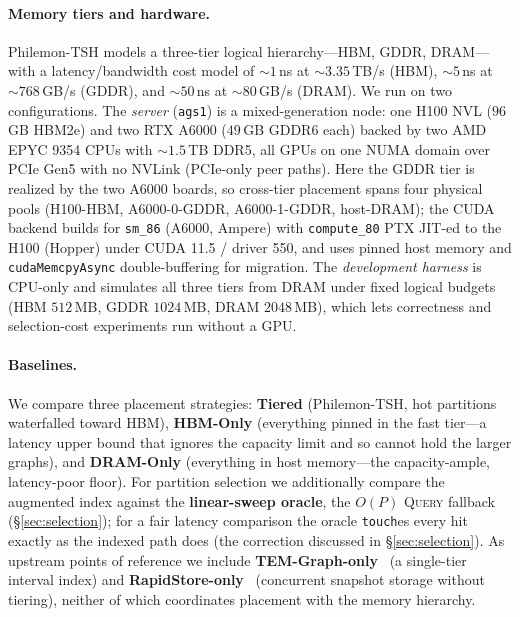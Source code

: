 \documentclass[10pt]{article}
\theoremstyle{definition}
\begin{document}
\paragraph{Memory tiers and hardware.}
Philemon-TSH models a three-tier logical hierarchy---HBM, GDDR, DRAM---with a
latency/bandwidth cost model of ${\sim}1$\,ns at ${\sim}3.35$\,TB/s (HBM),
${\sim}5$\,ns at ${\sim}768$\,GB/s (GDDR), and ${\sim}50$\,ns at ${\sim}80$\,GB/s
(DRAM). We run on two configurations. The \emph{server} (\texttt{ags1}) is a
mixed-generation node: one H100 NVL ($96$\,GB HBM2e) and two RTX A6000
($49$\,GB GDDR6 each) backed by two AMD EPYC 9354 CPUs with ${\sim}1.5$\,TB DDR5,
all GPUs on one NUMA domain over PCIe Gen5 with no NVLink (PCIe-only peer paths).
Here the GDDR tier is realized by the two A6000 boards, so cross-tier placement
spans four physical pools (H100-HBM, A6000-0-GDDR, A6000-1-GDDR, host-DRAM); the
CUDA backend builds for \texttt{sm\_86} (A6000, Ampere) with \texttt{compute\_80}
PTX JIT-ed to the H100 (Hopper) under CUDA 11.5 / driver 550, and uses pinned host
memory and \texttt{cudaMemcpyAsync} double-buffering for migration. The
\emph{development harness} is CPU-only and simulates all three tiers from DRAM
under fixed logical budgets (HBM $512$\,MB, GDDR $1024$\,MB, DRAM $2048$\,MB),
which lets correctness and selection-cost experiments run without a GPU.

\paragraph{Baselines.}
We compare three placement strategies: \textbf{Tiered} (Philemon-TSH, hot
partitions waterfalled toward HBM), \textbf{HBM-Only} (everything pinned in the
fast tier---a latency upper bound that ignores the capacity limit and so cannot
hold the larger graphs), and \textbf{DRAM-Only} (everything in host memory---the
capacity-ample, latency-poor floor). For partition selection we additionally
compare the augmented index against the \textbf{linear-sweep oracle}, the $O(P)$
\textsc{Query} fallback (\S\ref{sec:selection}); for a fair latency comparison the
oracle \texttt{touch}es every hit exactly as the indexed path does (the
correction discussed in \S\ref{sec:selection}). As upstream points of reference we
include \textbf{TEM-Graph-only}~\citep{temgraph} (a single-tier interval index)
and \textbf{RapidStore-only}~\citep{rapidstore} (concurrent snapshot storage
without tiering), neither of which coordinates placement with the memory
hierarchy.
\end{document}
